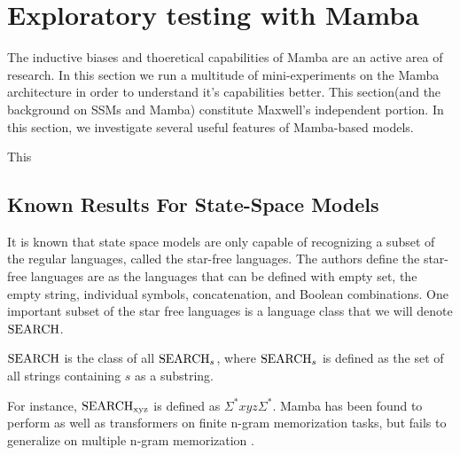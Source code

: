 \section{Exploratory testing with Mamba}
The inductive biases and thoeretical capabilities of Mamba are an active area of
research. In this section we run a multitude of mini-experiments on the Mamba
architecture in order to understand it's capabilities better.
This section(and the background on SSMs and Mamba) constitute Maxwell's
independent portion. In this section, we investigate several useful features of
Mamba-based models.

This 

\subsection{Known Results For State-Space Models}
It is known that state space models are only capable of recognizing a subset of
the regular languages\cite{ssmformal}, called the star-free languages.
The authors define the star-free languages are as the languages that can be
defined with empty set, the empty string, individual symbols, concatenation, and
Boolean combinations.
One important subset of the star free languages is a language class that we will
denote ${\text{SEARCH}}$.
\begin{definition}
    ${\text{SEARCH}}$ is the class of all ${\text{SEARCH}}_{s}$, where ${\text{SEARCH}}_{s}$ is defined
    as the set of all strings containing $s$ as a substring.
\end{definition}
For instance, ${\text{SEARCH}}_{\text{xyz}}$ is defined as $\Sigma^{*}xyz\Sigma^{*}$.
Mamba has been found to perform as well as transformers on finite n-gram
memorization tasks, but fails to generalize on multiple n-gram memorization
\cite{mambangram}.

